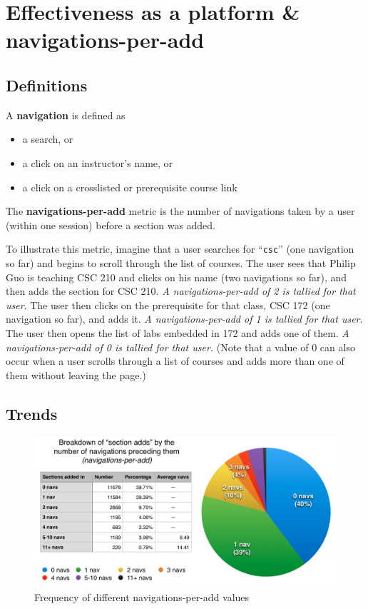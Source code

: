 
\section{Effectiveness as a platform \& navigations-per-add}

\subsection{Definitions}

A \textbf{navigation} is defined as

\onehalfspacing
\begin{itemize}
  \item a search, or
  \item a click on an instructor’s name, or
  \item a click on a crosslisted or prerequisite course link
\end{itemize}
\doublespacing

\noindent The \textbf{navigations-per-add} metric is the number of navigations taken by a user (within one session) before a section was added. 

To illustrate this metric, imagine that a user searches for ``{\tt csc}'' (one navigation so far) and begins to scroll through the list of courses. The user sees that Philip Guo is teaching CSC 210 and clicks on his name (two navigations so far), and then adds the section for CSC 210. \emph{A navigations-per-add of 2 is tallied for that user}. The user then clicks on the prerequisite for that class, CSC 172 (one navigation so far), and adds it. \emph{A navigations-per-add of 1 is tallied for that user}. The user then opens the list of labs embedded in 172 and adds one of them. \emph{A navigations-per-add of 0 is tallied for that user.} (Note that a value of 0 can also occur when a user scrolls through a list of courses and adds more than one of them without leaving the page.)

\subsection{Trends}

\begin{figure}
  \centering
  \includegraphics[width=1.0\textwidth]{images/graph/combined_navs}

  \caption{Frequency of different navigations-per-add values}
  \label{fig:navs-combined}
\end{figure}

